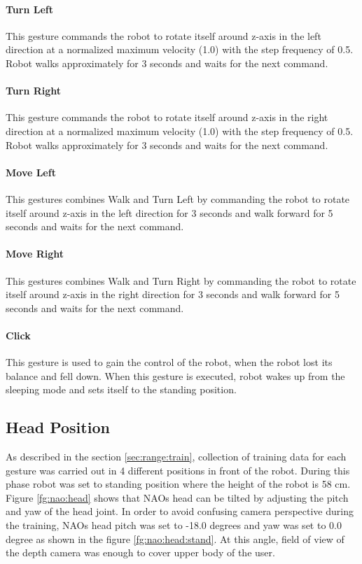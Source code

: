 \paragraph*{Turn Left} This gesture commands the robot to rotate itself around z-axis in the left direction at a normalized maximum velocity (1.0) with the step frequency of 0.5. Robot walks approximately for 3 seconds and waits for the next command.

\paragraph*{Turn Right} This gesture commands the robot to rotate itself around z-axis in the right direction at a normalized maximum velocity (1.0) with the step frequency of 0.5. Robot walks approximately for 3 seconds and waits for the next command.

\paragraph*{Move Left} This gestures combines Walk and Turn Left by commanding the robot to rotate itself around z-axis in the left direction for 3 seconds and walk forward for 5 seconds and waits for the next command.

\paragraph*{Move Right}  This gestures combines Walk and Turn Right by commanding the robot to rotate itself around z-axis in the right direction for 3 seconds and walk forward for 5 seconds and waits for the next command.

\paragraph*{Click} This gesture is used to gain the control of the robot, when the robot lost its balance and fell down. When this gesture is executed, robot wakes up from the sleeping mode and sets itself to the standing position.



\subsection{Head Position} As described in the section \ref{sec:range:train}, collection of training data for each gesture was carried out in 4 different positions in front of the robot. During this phase robot was set to standing position where the height of the robot is 58 cm. Figure \ref{fg:nao:head} shows that NAOs head can be tilted by adjusting the pitch and yaw of the head joint. In order to avoid confusing camera perspective during the training, NAOs head pitch was set to -18.0 degrees and yaw was set to 0.0 degree as shown in the figure \ref{fg:nao:head:stand}. At this angle, field of view of the depth camera was enough to cover upper body of the user. 


